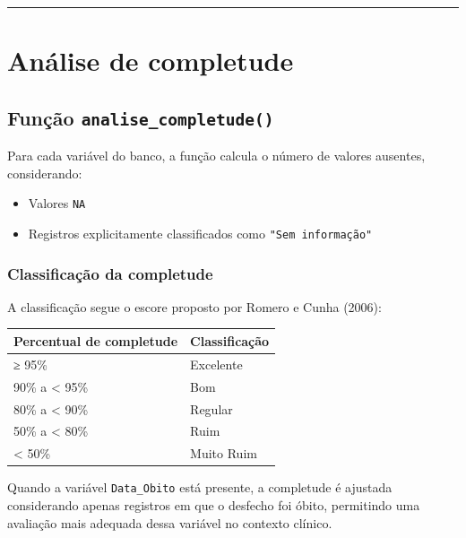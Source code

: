 \documentclass[
  brazilian,
  a4paper,
  oneside]{scrbook}
\newcounter{none} %
\providecommand{\tightlist}{%
  \setlength{\itemsep}{0pt}\setlength{\parskip}{0pt}}
\begin{document}
\begin{center}\rule{0.5\linewidth}{0.5pt}\end{center}

\section{Análise de completude}\label{anuxe1lise-de-completude}

\subsection{\texorpdfstring{Função
\texttt{analise\_completude()}}{Função analise\_completude()}}\label{funuxe7uxe3o-analise_completude}

Para cada variável do banco, a função calcula o número de valores
ausentes, considerando:

\begin{itemize}
\tightlist
\item
  Valores \texttt{NA}
\item
  Registros explicitamente classificados como \texttt{"Sem\ informação"}
\end{itemize}

\subsubsection{Classificação da
completude}\label{classificauxe7uxe3o-da-completude}

A classificação segue o escore proposto por Romero e Cunha (2006):

{\def\LTcaptype{none} %
\begin{longtable}[]{@{}ll@{}}
\toprule\noalign{}
Percentual de completude & Classificação \\
\midrule\noalign{}
\endhead
\bottomrule\noalign{}
\endlastfoot
≥ 95\% & Excelente \\
90\% a \textless{} 95\% & Bom \\
80\% a \textless{} 90\% & Regular \\
50\% a \textless{} 80\% & Ruim \\
\textless{} 50\% & Muito Ruim \\
\end{longtable}
}

\begin{tcolorbox}[enhanced jigsaw, arc=.35mm, bottomrule=.15mm, bottomtitle=1mm, breakable, colback=white, colbacktitle=quarto-callout-tip-color!10!white, colframe=quarto-callout-tip-color-frame, coltitle=black, left=2mm, leftrule=.75mm, opacityback=0, opacitybacktitle=0.6, rightrule=.15mm, title=\textcolor{quarto-callout-tip-color}{\faLightbulb}\hspace{0.5em}{Ajuste para \texttt{Data\_Obito}}, titlerule=0mm, toprule=.15mm, toptitle=1mm]

Quando a variável \texttt{Data\_Obito} está presente, a completude é
ajustada considerando apenas registros em que o desfecho foi óbito,
permitindo uma avaliação mais adequada dessa variável no contexto
clínico.

\end{tcolorbox}
\end{document}
